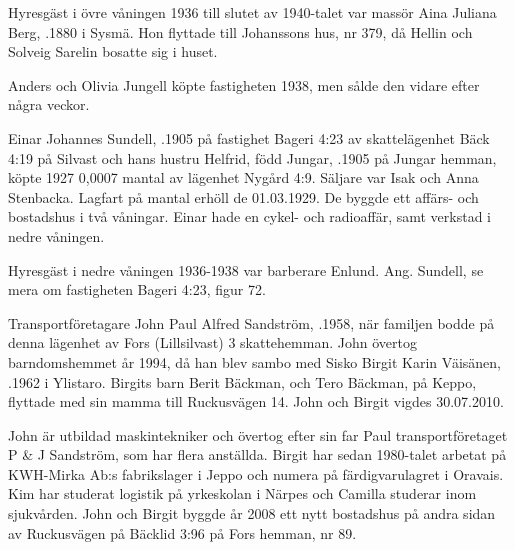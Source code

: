 Hyresgäst i övre våningen 1936 till slutet av 1940-talet var massör	Aina Juliana Berg, .1880 i Sysmä. Hon flyttade till Johanssons hus, nr 379, då Hellin och Solveig Sarelin bosatte sig i huset.


Anders och Olivia Jungell köpte fastigheten 1938, men sålde den vidare efter några veckor.\jhvspace{}


Einar Johannes Sundell, .1905 på fastighet Bageri 4:23 av 	skattelägenhet Bäck 4:19 på Silvast och hans hustru Helfrid, född Jungar, .1905 på Jungar hemman, köpte 1927 0,0007 mantal av lägenhet Nygård 4:9. Säljare var Isak och Anna Stenbacka. Lagfart på mantal erhöll de 01.03.1929. De byggde ett affärs- och bostadshus i två våningar. Einar hade en cykel- och radioaffär, samt verkstad i nedre våningen.

Hyresgäst i nedre våningen 1936-1938 var barberare Enlund.
Ang. Sundell, se mera om fastigheten Bageri 4:23, figur 72.






Transportföretagare John Paul Alfred Sandström, .1958, när familjen bodde på denna lägenhet av Fors (Lillsilvast) 3 skattehemman. John övertog barndomshemmet år 1994, då han blev sambo med Sisko Birgit Karin Väisänen, .1962 i Ylistaro. Birgits barn Berit Bäckman,  och Tero Bäckman,  på Keppo, flyttade med sin mamma till Ruckusvägen 14. John och Birgit vigdes 30.07.2010.
\begin{jhchildren}
  \item {}
  \item {}
\end{jhchildren}

John är utbildad maskintekniker och övertog efter sin far Paul transportföretaget P \& J Sandström, som har flera anställda. Birgit har sedan 1980-talet arbetat på KWH-Mirka Ab:s fabrikslager i Jeppo och numera på färdigvarulagret i Oravais. Kim har studerat logistik på yrkeskolan i Närpes och Camilla studerar inom sjukvården. John och Birgit byggde år 2008 ett nytt bostadshus på andra sidan av Ruckusvägen på Bäcklid 3:96 på Fors hemman, nr 89.

